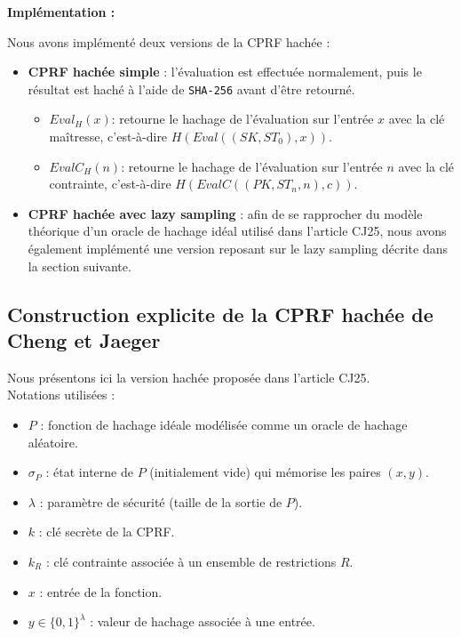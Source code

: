 \documentclass[9pt]{extarticle}
\begin{document}
\textbf{Implémentation :}

Nous avons implémenté deux versions de la CPRF hachée :

\begin{itemize}
  \item \textbf{CPRF hachée simple} : l’évaluation est effectuée normalement,
  puis le résultat est haché à l’aide de \texttt{SHA-256} avant d’être retourné.
    \begin{itemize}
      \item \texttt{$Eval_H(x)$}: retourne le hachage de l’évaluation sur l’entrée $x$ avec la clé maîtresse, c’est-à-dire $H(Eval((SK, ST_0), x))$.
      \item \texttt{$EvalC_H(n)$}: retourne le hachage de l’évaluation sur l’entrée $n$ avec la clé contrainte, c’est-à-dire $H(EvalC((PK, ST_n, n), c))$.
    \end{itemize}

  \item \textbf{CPRF hachée avec lazy sampling} : afin de se rapprocher du modèle
  théorique d’un oracle de hachage idéal utilisé dans l'article CJ25, nous avons également implémenté
  une version reposant sur le lazy sampling décrite dans la section suivante.
\end{itemize}


\subsection{Construction explicite de la CPRF hachée de Cheng et Jaeger}

Nous présentons ici la version hachée proposée dans l'article CJ25.\\

Notations utilisées :
\begin{itemize}
  \item $P$ : fonction de hachage idéale modélisée comme un oracle de hachage aléatoire.
  \item $\sigma_P$ : état interne de $P$ (initialement vide) qui mémorise les paires $(x,y)$.
  \item $\lambda$ : paramètre de sécurité (taille de la sortie de $P$).
  \item $k$ : clé secrète de la \textsf{CPRF}.
  \item $k_R$ : clé contrainte associée à un ensemble de restrictions $R$.
  \item $x$ : entrée de la fonction.
  \item $y \in \{0,1\}^{\lambda}$ : valeur de hachage associée à une entrée.
\end{itemize}
\end{document}
